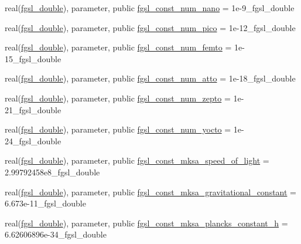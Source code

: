 \begin{DoxyCompactItemize}
\item 
real(\hyperlink{namespacefgsl_a9af5113378e0f000eb479d3f90196ddf}{fgsl\+\_\+double}), parameter, public \hyperlink{namespacefgsl_a18d57365a461c2adc8f4e0ddb4c690d6}{fgsl\+\_\+const\+\_\+num\+\_\+nano} = 1e-\/9\+\_\+fgsl\+\_\+double
\item 
real(\hyperlink{namespacefgsl_a9af5113378e0f000eb479d3f90196ddf}{fgsl\+\_\+double}), parameter, public \hyperlink{namespacefgsl_a8a137e17b45fbfd8a37ef012e9b522ab}{fgsl\+\_\+const\+\_\+num\+\_\+pico} = 1e-\/12\+\_\+fgsl\+\_\+double
\item 
real(\hyperlink{namespacefgsl_a9af5113378e0f000eb479d3f90196ddf}{fgsl\+\_\+double}), parameter, public \hyperlink{namespacefgsl_a3ab8d745c9129ec33f7556e68234b60b}{fgsl\+\_\+const\+\_\+num\+\_\+femto} = 1e-\/15\+\_\+fgsl\+\_\+double
\item 
real(\hyperlink{namespacefgsl_a9af5113378e0f000eb479d3f90196ddf}{fgsl\+\_\+double}), parameter, public \hyperlink{namespacefgsl_aca23ff810481681a4329c406eb3c4bbc}{fgsl\+\_\+const\+\_\+num\+\_\+atto} = 1e-\/18\+\_\+fgsl\+\_\+double
\item 
real(\hyperlink{namespacefgsl_a9af5113378e0f000eb479d3f90196ddf}{fgsl\+\_\+double}), parameter, public \hyperlink{namespacefgsl_ac924f9358aa8ca1b7a72025328901e8e}{fgsl\+\_\+const\+\_\+num\+\_\+zepto} = 1e-\/21\+\_\+fgsl\+\_\+double
\item 
real(\hyperlink{namespacefgsl_a9af5113378e0f000eb479d3f90196ddf}{fgsl\+\_\+double}), parameter, public \hyperlink{namespacefgsl_a97bcc951d0797621c0a06cb1d63cad49}{fgsl\+\_\+const\+\_\+num\+\_\+yocto} = 1e-\/24\+\_\+fgsl\+\_\+double
\item 
real(\hyperlink{namespacefgsl_a9af5113378e0f000eb479d3f90196ddf}{fgsl\+\_\+double}), parameter, public \hyperlink{namespacefgsl_a3d8ceae8504f8bd508cbd8865e1ba1b8}{fgsl\+\_\+const\+\_\+mksa\+\_\+speed\+\_\+of\+\_\+light} = 2.\+99792458e8\+\_\+fgsl\+\_\+double
\item 
real(\hyperlink{namespacefgsl_a9af5113378e0f000eb479d3f90196ddf}{fgsl\+\_\+double}), parameter, public \hyperlink{namespacefgsl_a74c4f68c51be744dc16f9de6679690a1}{fgsl\+\_\+const\+\_\+mksa\+\_\+gravitational\+\_\+constant} = 6.\+673e-\/11\+\_\+fgsl\+\_\+double
\item 
real(\hyperlink{namespacefgsl_a9af5113378e0f000eb479d3f90196ddf}{fgsl\+\_\+double}), parameter, public \hyperlink{namespacefgsl_a1f1f5a27cac13f7f29c34ccb809e2eae}{fgsl\+\_\+const\+\_\+mksa\+\_\+plancks\+\_\+constant\+\_\+h} = 6.\+62606896e-\/34\+\_\+fgsl\+\_\+double
\item 

\end{DoxyCompactItemize}
